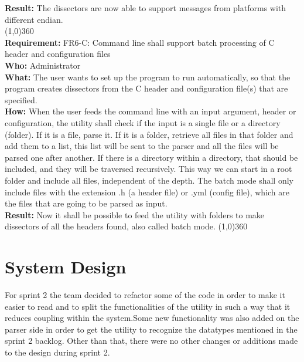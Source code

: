 \textbf{Result:} The dissectors are now able to support messages from platforms with different endian.\\
\line(1,0){360}\\
\textbf{Requirement:} FR6-C: Command line shall support batch processing of C header and configuration files\\
\textbf{Who:} Administrator\\
\textbf{What:} The user wants to set up the program to run automatically, so that the program creates dissectors from the C header and configuration file(s) that are specified.\\
\textbf{How:} When the user feeds the command line with an input argument, header or configuration, the utility shall check if the input is a single file or a directory (folder). If it is a file, parse it. If it is a folder, retrieve all files in that folder and add them to a list, this list will be sent to the parser and all the files will be parsed one after another. If there is a directory within a directory, that should be included, and they will be traversed recursively. This way we can start in a root folder and include all files, independent of the depth. The batch mode shall only include files with the extension .h (a header file) or .yml (config file), which are the files that are going to be parsed as input.\\
\textbf{Result:} Now it shall be possible to feed the utility with folders to make dissectors of all the headers found, also called batch mode.
\line(1,0){360}\\	


\section{System Design}
For sprint 2 the team decided to refactor some of the code in order to make it easier to read and to split the functionalities of the utility in such a way that it reduces coupling within the system.Some new functionality was also added on the parser side in order to get the utility to recognize the datatypes mentioned in the sprint 2 backlog. Other than that, there were no other changes or additions made to the design during sprint 2.


